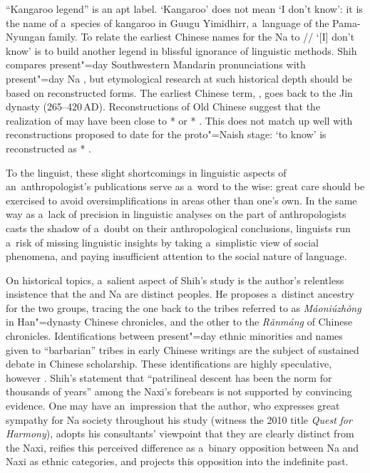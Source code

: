 {\noindent}“Kangaroo legend” is an apt label. ‘Kangaroo' does not mean ‘I don't know': it is the name of a~species of kangaroo in Guugu Yimidhirr, a~language of the Pama-Nyungan family. To relate the earliest Chinese names for the Na to // ‘[I] don’t know’ is to build another legend in blissful ignorance of linguistic methods. Shih compares present"=day {Southwestern Mandarin} pronunciations
with present"=day Na \citep[26--27]{shih2010}, but etymological research at such historical depth
should be based on reconstructed forms. The earliest Chinese term, , goes back to the Jin dynasty
(265--420\,AD). Reconstructions of Old Chinese suggest that the realization of  may have been close to
* or * \citep{baxter2000}. This does not match up well with reconstructions
proposed to date for the proto"={Naish} stage: ‘to know’ is reconstructed as * \citep{jacquesetal2011}.

To the linguist, these slight shortcomings in linguistic aspects of an~anthropologist’s publications
serve as a~word to the wise: great care should be exercised to avoid oversimplifications in areas
other than one’s own. In the same way as a~lack of precision in linguistic analyses on the part of
anthropologists casts the shadow of a~doubt on their anthropological conclusions, linguists run
a~risk of missing linguistic insights by taking a~simplistic view of social phenomena, and paying
insufficient attention to the social nature of language.

\largerpage[-2]%
On historical topics, a~salient aspect of Shih’s study is the author’s relentless insistence that
the  and Na are distinct peoples. He proposes a~distinct ancestry for the two groups, tracing
the one back to the tribes referred to as \textit{Máoniúzhǒng} 
 in Han"=dynasty Chinese chronicles, and the other to the 
\textit{Rǎnmáng}
 of Chinese chronicles. Identifications between present"=day ethnic minorities and names
given to “barbarian” tribes in early Chinese writings are the subject of sustained debate in Chinese
scholarship. These identifications are highly speculative, however \citep{gros2014b}. Shih’s statement that
“patrilineal descent has been the norm for thousands of years” among the {Naxi}’s forebears is not
supported by convincing evidence. One may have an~impression that the author, who expresses great
sympathy for Na society throughout his study (witness the 2010 title \textit{Quest} \textit{for}
\textit{Harmony}), adopts his consultants’ viewpoint that they are clearly distinct from the {Naxi},
reifies this perceived difference as a~binary opposition between Na and {Naxi} as ethnic categories,
and projects this opposition into the indefinite past.

